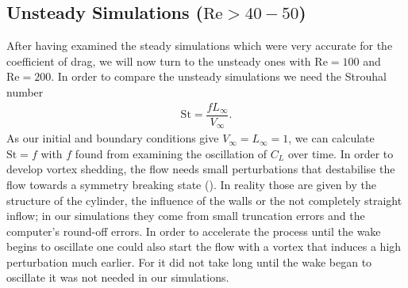 	\subsection{Unsteady Simulations ($\text{Re}> 40-50$)}
	After having examined the steady simulations which were very accurate for the coefficient of drag, we will now turn to the unsteady ones with $\text{Re}=100$ and $\text{Re}=200$.
	In order to compare the unsteady simulations we need the Strouhal number
	\begin{align}
		\text{St} = \dfrac{f  L_\infty}{V_\infty}.
	\end{align}
	As our initial and boundary conditions give $V_\infty = L_\infty = 1$, we can calculate $\text{St} = f$ with $f$ found from examining the oscillation of $C_L$ over time. In order to develop vortex shedding, the flow needs small perturbations that destabilise the flow towards a symmetry breaking state (\textcite{FLM:14223}). In reality those are given by the structure of the cylinder, the influence of the walls or the not completely straight inflow; in our simulations they come from small truncation errors and the computer's round-off errors. 
	In order to accelerate the process until the wake begins to oscillate one could also start the flow with a vortex that induces a high perturbation much earlier. For it did not take long until the wake began to oscillate it was not needed in our simulations.
